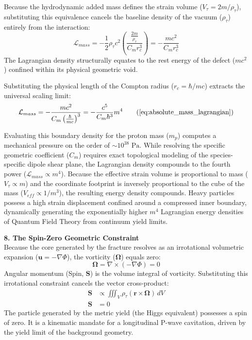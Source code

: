 Because the hydrodynamic added mass defines the strain volume ($V_\tau = 2m/\rho_\tau$), substituting this equivalence cancels the baseline density of the vacuum ($\rho_\tau$) entirely from the interaction:
\begin{equation}
    \mathcal{L}_{mass} = - \frac{1}{2} \rho_{\tau} c^2 \left( \frac{ \frac{2m}{\rho_\tau} }{C_m r_c^3} \right) = - \frac{mc^2}{C_m r_c^3}
\end{equation}
The Lagrangian density structurally equates to the rest energy of the defect ($mc^2$) confined within its physical geometric void.

Substituting the physical length of the Compton radius ($r_c = \hbar/mc$) extracts the universal scaling limit:
\begin{equation}
    \mathcal{L}_{mass} = - \frac{mc^2}{C_m \left(\frac{\hbar}{mc}\right)^3} = - \frac{c^5}{C_m \hbar^3} m^4 \tag{\ref{eq:absolute_mass_lagrangian}}
\end{equation}

Evaluating this boundary density for the proton mass ($m_p$) computes a mechanical pressure on the order of $\sim 10^{38} \text{ Pa}$. While resolving the specific geometric coefficient ($C_m$) requires exact topological modeling of the species-specific dipole shear plane, the Lagrangian density compounds to the fourth power ($\mathcal{L}_{mass} \propto m^4$). Because the effective strain volume is proportional to mass ($V_\tau \propto m$) and the coordinate footprint is inversely proportional to the cube of the mass ($V_{eff} \propto 1/m^3$), the resulting energy density compounds. Heavy particles possess a high strain displacement confined around a compressed inner boundary, dynamically generating the exponentially higher $m^4$ Lagrangian energy densities of Quantum Field Theory from continuum yield limits.

\vspace{0.2 cm}

\textbf{8. The Spin-Zero Geometric Constraint}\\
Because the core generated by the fracture resolves as an irrotational volumetric expansion ($\mathbf{u} = -\nabla \Phi$), the vorticity ($\boldsymbol{\Omega}$) equals zero:
\begin{equation}
    \boldsymbol{\Omega} = \nabla \times (-\nabla \Phi) = 0 \nonumber
\end{equation}
Angular momentum (Spin, $\mathbf{S}$) is the volume integral of vorticity. Substituting this irrotational constraint cancels the vector cross-product:
\begin{align}
    \mathbf{S} &\propto \iiint_V \rho_{\tau} (\mathbf{r} \times \boldsymbol{\Omega}) \, dV \nonumber \\
    \mathbf{S} &= 0 \label{eq:spin_zero_proof}
\end{align}
The particle generated by the metric yield (the Higgs equivalent) possesses a spin of zero. It is a kinematic mandate for a longitudinal P-wave cavitation, driven by the yield limit of the background geometry.

